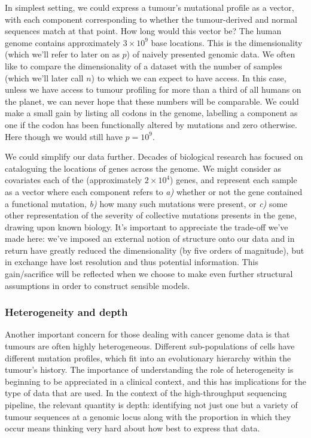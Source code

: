 \documentclass[thesis.tex]{subfiles}
\begin{document}
In simplest setting, we could express a tumour's mutational profile as a vector, with each component corresponding to whether the tumour-derived and normal sequences match at that point. How long would this vector be? The human genome contains approximately $3\times 10^9$ base locations. This is the dimensionality (which we'll refer to later on as $p$) of naively presented genomic data. We often like to compare the dimensionality of a dataset with the number of samples (which we'll later call $n$) to which we can expect to have access. In this case, unless we have access to tumour profiling for more than a third of all humans on the planet, we can never hope that these numbers will be comparable. We could make a small gain by listing all codons in the genome, labelling a component as one if the codon has been functionally altered by mutations and zero otherwise. Here though we would still have $p = 10^9$.

We could simplify our data further. Decades of biological research has focused on cataloguing the locations of genes across the genome. We might consider as covariates each of the (approximately $2\times 10^4$) genes, and represent each sample as a vector where each component refers to \textit{a)} whether or not the gene contained a functional mutation, \textit{b)} how many such mutations were present, or \textit{c)} some other representation of the severity of collective mutations presents in the gene, drawing upon known biology. It's important to appreciate the trade-off we've made here: we've imposed an external notion of structure onto our data and in return have greatly reduced the dimensionality (by five orders of magnitude), but in exchange have lost resolution and thus potential information. This gain/sacrifice will be reflected when we choose to make even further structural assumptions in order to construct sensible models.

\subsubsection{Heterogeneity and depth}
Another important concern for those dealing with cancer genome data is that tumours are often highly heterogeneous. Different sub-populations of cells have different mutation profiles, which fit into an evolutionary hierarchy within the tumour's history. The importance of understanding the role of heterogeneity is beginning to be appreciated in a clinical context, and this has implications for the type of data that are used. In the context of the high-throughput sequencing pipeline, the relevant quantity is depth: identifying not just one but a variety of tumour sequences at a genomic locus along with the proportion in which they occur means thinking very hard about how best to express that data.
\end{document}

